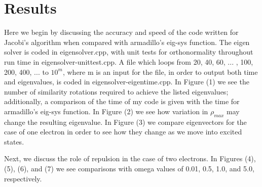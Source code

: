 \documentclass[11pt,a4paper]{article}
\begin{document}
{\section{Results}

Here we begin by discussing the accuracy and speed of the code written for Jacobi's algorithm when compared with armadillo's eig-sys function. The eigen solver is coded in eigensolver.cpp, with unit tests for orthonormality throughout run time in eigensolver-unittest.cpp. A file which loops from 20, 40, 60, ... , 100, 200, 400, ... to $10^m$, where m is an input for the file, in order to output both time and eigenvalues, is coded in eigensolver-eigentime.cpp. In Figure (1) we see the number of similarity rotations required to achieve the listed eigenvalues; additionally, a comparison of the time of my code is given with the time for armadillo's eig-sys function. In Figure (2) we see how variation in $\rho_{max}$ may change the resulting eigenvalue. In Figure (3) we compare eigenvectors for the case of one electron in order to see how they change as we move into excited states. 

Next, we discuss the role of repulsion in the case of two electrons. In Figures (4), (5), (6), and (7) we see comparisons with omega values of 0.01, 0.5, 1.0, and 5.0, respectively.

}
\end{document}
